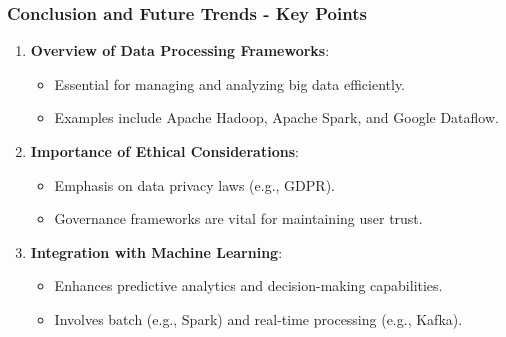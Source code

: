 \documentclass[aspectratio=169]{beamer}
\begin{document}
\begin{frame}[fragile]
  \frametitle{Conclusion and Future Trends - Key Points}
  
  \begin{enumerate}
      \item \textbf{Overview of Data Processing Frameworks}:
      \begin{itemize}
          \item Essential for managing and analyzing big data efficiently.
          \item Examples include Apache Hadoop, Apache Spark, and Google Dataflow.
      \end{itemize}
      
      \item \textbf{Importance of Ethical Considerations}:
      \begin{itemize}
          \item Emphasis on data privacy laws (e.g., GDPR).
          \item Governance frameworks are vital for maintaining user trust.
      \end{itemize}
      
      \item \textbf{Integration with Machine Learning}:
      \begin{itemize}
          \item Enhances predictive analytics and decision-making capabilities.
          \item Involves batch (e.g., Spark) and real-time processing (e.g., Kafka).
      \end{itemize}
  \end{enumerate}

\end{frame}
\end{document}
